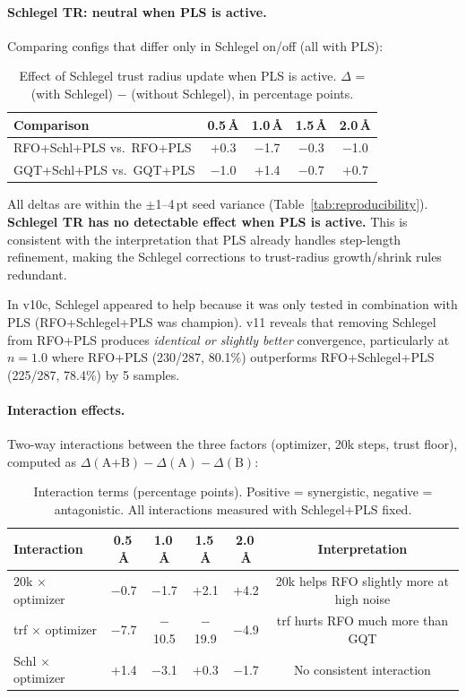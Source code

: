 \documentclass[11pt,a4paper]{article}
\theoremstyle{definition}
\begin{document}
\paragraph{Schlegel TR: neutral when PLS is active.}
Comparing configs that differ only in Schlegel on/off (all with PLS):

\begin{table}[h]
\centering
\caption{Effect of Schlegel trust radius update when PLS is active.
  $\Delta$ = (with Schlegel) $-$ (without Schlegel), in percentage points.}
\label{tab:schlegel-with-pls}
\begin{tabular}{lcccc}
\toprule
Comparison & 0.5\,\AA & 1.0\,\AA & 1.5\,\AA & 2.0\,\AA \\
\midrule
RFO+Schl+PLS vs.\ RFO+PLS & $+$0.3 & $-$1.7 & $-$0.3 & $-$1.0 \\
GQT+Schl+PLS vs.\ GQT+PLS & $-$1.0 & $+$1.4 & $-$0.7 & $+$0.7 \\
\bottomrule
\end{tabular}
\end{table}

All deltas are within the $\pm$1--4\,pt seed variance
(Table~\ref{tab:reproducibility}).  \textbf{Schlegel TR has no detectable
effect when PLS is active.}  This is consistent with the interpretation
that PLS already handles step-length refinement, making the Schlegel
corrections to trust-radius growth/shrink rules redundant.

In v10c, Schlegel appeared to help because it was only tested in
combination with PLS (RFO+Schlegel+PLS was champion).  v11 reveals that
removing Schlegel from RFO+PLS produces \emph{identical or slightly better}
convergence, particularly at $n=1.0$ where RFO+PLS (230/287, 80.1\%)
outperforms RFO+Schlegel+PLS (225/287, 78.4\%) by 5 samples.

\paragraph{Interaction effects.}
Two-way interactions between the three factors (optimizer, 20k steps,
trust floor), computed as $\Delta(\text{A+B}) - \Delta(\text{A}) -
\Delta(\text{B})$:

\begin{table}[h]
\centering
\caption{Interaction terms (percentage points).  Positive = synergistic,
  negative = antagonistic.  All interactions measured with Schlegel+PLS fixed.}
\label{tab:interactions}
\begin{tabular}{lccccc}
\toprule
Interaction & 0.5\,\AA & 1.0\,\AA & 1.5\,\AA & 2.0\,\AA & Interpretation \\
\midrule
20k $\times$ optimizer  & $-$0.7 & $-$1.7 & $+$2.1 & $+$4.2 & 20k helps RFO slightly more at high noise \\
trf $\times$ optimizer  & $-$7.7 & $-$10.5 & $-$19.9 & $-$4.9 & trf hurts RFO much more than GQT \\
Schl $\times$ optimizer & $+$1.4 & $-$3.1 & $+$0.3 & $-$1.7 & No consistent interaction \\
\bottomrule
\end{tabular}
\end{table}
\end{document}
